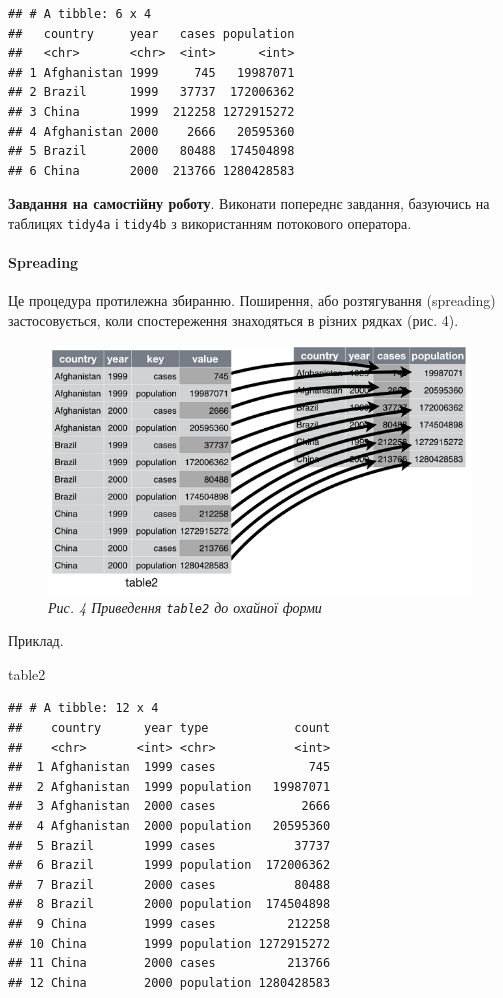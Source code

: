 \documentclass[
]{book}
\newenvironment{Shaded}{\begin{snugshade}}{\end{snugshade}}
\newcommand{\NormalTok}[1]{#1}
\begin{document}
\begin{verbatim}
## # A tibble: 6 x 4
##   country     year   cases population
##   <chr>       <chr>  <int>      <int>
## 1 Afghanistan 1999     745   19987071
## 2 Brazil      1999   37737  172006362
## 3 China       1999  212258 1272915272
## 4 Afghanistan 2000    2666   20595360
## 5 Brazil      2000   80488  174504898
## 6 China       2000  213766 1280428583
\end{verbatim}

\textbf{Завдання на самостійну роботу}. Виконати попереднє завдання, базуючись на таблицях \texttt{tidy4a} і \texttt{tidy4b} з використанням потокового оператора.

\hypertarget{spreading}{%
\paragraph{Spreading}\label{spreading}}

Це процедура протилежна збиранню. Поширення, або розтягування (spreading) застосовується, коли спостереження знаходяться в різних рядках (рис. 4).

\begin{figure}
\centering
\includegraphics{image/table2.png}
\caption{\emph{Рис. 4 Приведення \texttt{table2} до охайної форми}}
\end{figure}

Приклад.

\begin{Shaded}
\begin{Highlighting}[]
\NormalTok{table2}
\end{Highlighting}
\end{Shaded}

\begin{verbatim}
## # A tibble: 12 x 4
##    country      year type            count
##    <chr>       <int> <chr>           <int>
##  1 Afghanistan  1999 cases             745
##  2 Afghanistan  1999 population   19987071
##  3 Afghanistan  2000 cases            2666
##  4 Afghanistan  2000 population   20595360
##  5 Brazil       1999 cases           37737
##  6 Brazil       1999 population  172006362
##  7 Brazil       2000 cases           80488
##  8 Brazil       2000 population  174504898
##  9 China        1999 cases          212258
## 10 China        1999 population 1272915272
## 11 China        2000 cases          213766
## 12 China        2000 population 1280428583
\end{verbatim}
\end{document}
